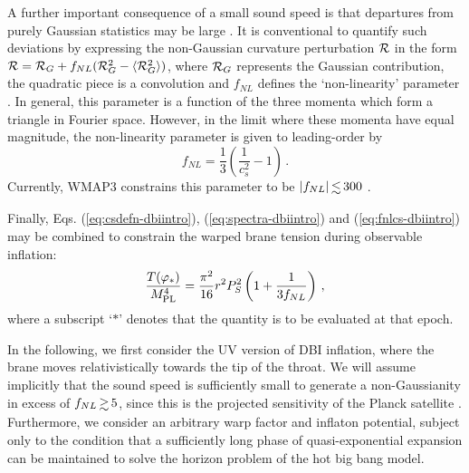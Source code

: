 A further important consequence of a small sound speed is that departures  
from purely Gaussian statistics may be large 
\cite{brane6,brane11,lidser3,chenetal}. 
It is conventional 
to quantify such deviations by expressing the non-Gaussian curvature 
perturbation ${\cal{R}}$ in the form 
${\cal{R}} ={\cal{R}}_G+f_{NL}
({\cal{R}}^2_G -\langle {\cal{R}}^2_G \rangle)$, where 
${\cal{R}}_G$ represents the Gaussian contribution, 
the quadratic piece is a convolution and $f_{NL}$ defines 
the `non-linearity' parameter \cite{maldacena}. 
In general, this parameter is a function of the three momenta which 
form a triangle in Fourier space. However, in the limit where 
these momenta have equal magnitude, the non-linearity parameter 
is given to leading-order by \cite{chenetal,lidser2}  
% 
\begin{equation}
\label{eq:fnlcs-dbiintro}
f_{NL} = \frac{1}{3} \left( \frac{1}{c_s^2} -1 \right) \,.
\end{equation}
% 
Currently, WMAP3 constrains this parameter  
to be ${| f_{NL} |} \, {\lsim} \, {300}$ \cite{spergel,crim}.  


Finally, Eqs. (\ref{eq:csdefn-dbiintro}), (\ref{eq:spectra-dbiintro}) and (\ref{eq:fnlcs-dbiintro}) 
may be combined to constrain the warped brane tension 
during observable inflation: 
% 
\begin{equation}
\label{eq:obswarp-dbiintro}
\frac{T (\varphi_*)}{M_{\mathrm{PL}}^4}  = 
\frac{\pi^2}{16} r^2P_S^2 \left( 1+\frac{1}{3f_{NL}} \right) \,,
\end{equation}
% 
where a subscript `$*$' denotes that the quantity is to be evaluated 
at that epoch. 


In the following, we first consider the UV version of DBI inflation,
where the brane moves relativistically 
towards the tip of the throat. We will assume implicitly 
that the sound speed is sufficiently small to generate a non-Gaussianity in 
excess of $f_{NL} \, {\gsim} \, 5$, since this is the projected 
sensitivity of the Planck satellite \cite{planck}. Furthermore, we consider   
an arbitrary warp factor and inflaton potential, 
subject only to the condition that a sufficiently long phase of 
quasi-exponential expansion can be maintained to solve the horizon problem of
the hot big bang model. 
% 
%




